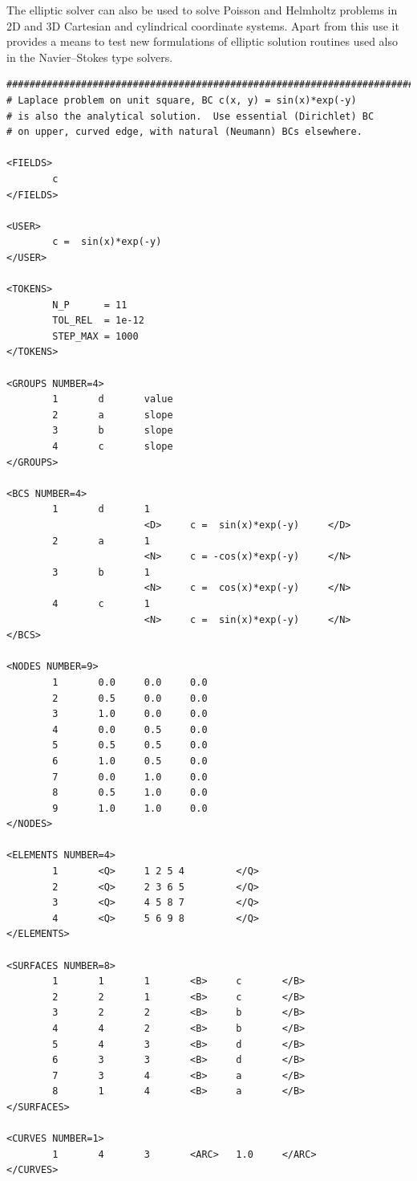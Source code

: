 \documentclass[11pt,a4paper]{report}
\begin{document}
The elliptic solver can also be used to solve Poisson and Helmholtz
problems in 2D and 3D Cartesian and cylindrical coordinate systems.
Apart from this use it provides a means to test new formulations of
elliptic solution routines used also in the Navier--Stokes type
solvers.

{\small
\begin{verbatim}
##############################################################################
# Laplace problem on unit square, BC c(x, y) = sin(x)*exp(-y)
# is also the analytical solution.  Use essential (Dirichlet) BC
# on upper, curved edge, with natural (Neumann) BCs elsewhere.

<FIELDS>
        c
</FIELDS>

<USER>
        c =  sin(x)*exp(-y)
</USER>

<TOKENS>
        N_P      = 11
        TOL_REL  = 1e-12
        STEP_MAX = 1000
</TOKENS>

<GROUPS NUMBER=4>
        1       d       value
        2       a       slope
        3       b       slope
        4       c       slope
</GROUPS>

<BCS NUMBER=4>
        1       d       1
                        <D>     c =  sin(x)*exp(-y)     </D>
        2       a       1
                        <N>     c = -cos(x)*exp(-y)     </N>
        3       b       1
                        <N>     c =  cos(x)*exp(-y)     </N>
        4       c       1
                        <N>     c =  sin(x)*exp(-y)     </N>
</BCS>

<NODES NUMBER=9>
        1       0.0     0.0     0.0
        2       0.5     0.0     0.0
        3       1.0     0.0     0.0
        4       0.0     0.5     0.0
        5       0.5     0.5     0.0
        6       1.0     0.5     0.0
        7       0.0     1.0     0.0
        8       0.5     1.0     0.0
        9       1.0     1.0     0.0
</NODES>

<ELEMENTS NUMBER=4>
        1       <Q>     1 2 5 4         </Q>
        2       <Q>     2 3 6 5         </Q>
        3       <Q>     4 5 8 7         </Q>
        4       <Q>     5 6 9 8         </Q>
</ELEMENTS>

<SURFACES NUMBER=8>
        1       1       1       <B>     c       </B>
        2       2       1       <B>     c       </B>
        3       2       2       <B>     b       </B>
        4       4       2       <B>     b       </B>
        5       4       3       <B>     d       </B>
        6       3       3       <B>     d       </B>
        7       3       4       <B>     a       </B>
        8       1       4       <B>     a       </B>
</SURFACES>

<CURVES NUMBER=1>
        1       4       3       <ARC>   1.0     </ARC>
</CURVES>
\end{verbatim}
}
\end{document}
